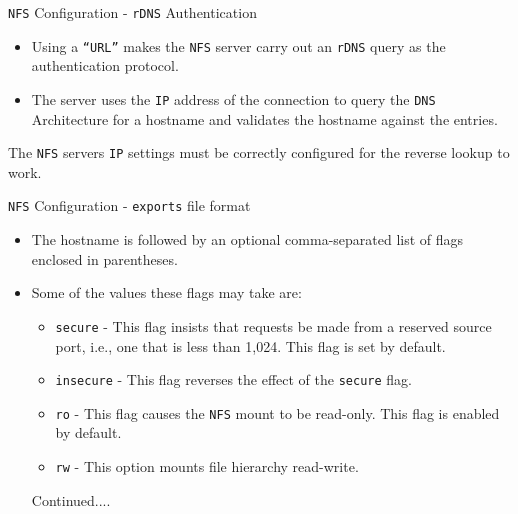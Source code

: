 \documentclass[xcolor=table,aspectratio=169]{beamer}
\begin{document}
\begin{frame}{\texttt{NFS} Configuration - \texttt{rDNS} Authentication}
  \begin{itemize}
    \item Using a \texttt{``URL''} makes the \texttt{NFS} server carry out an \texttt{rDNS} query as the authentication protocol.
    \item The server uses the \texttt{IP} address of the connection to query the \texttt{DNS} Architecture for a hostname and validates the hostname against the entries.
  \end{itemize}
  \begin{tcolorbox}
    \begin{center}
      \scriptsize The \texttt{NFS} servers \texttt{IP} settings must be correctly configured for the reverse lookup to work.
    \end{center}
  \end{tcolorbox}
\end{frame}

\begin{frame}{\texttt{NFS} Configuration - \texttt{exports} file format}
  \begin{itemize}
    \item The hostname is followed by an optional comma-separated list of flags enclosed in parentheses. 
    \item Some of the values these flags may take are: 
      \begin{itemize}
        \item \texttt{secure} - This flag insists that requests be made from a reserved source port, i.e., one that is less than 1,024. This flag is set by default.
        \item \texttt{insecure} - This flag reverses the effect of the \texttt{secure} flag.
        \item \texttt{ro} - This flag causes the \texttt{NFS} mount to be read-only. This flag is enabled by default.
        \item \texttt{rw} - This option mounts file hierarchy read-write.
      \end{itemize}
      Continued....
  \end{itemize}
\end{frame}
\end{document}
